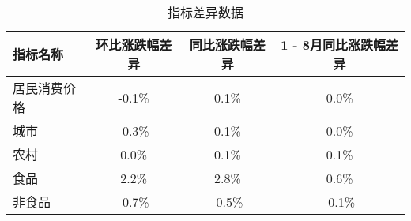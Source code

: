 \begin{table}[h]
    \centering
    \caption{指标差异数据}
    \begin{tabular}{lccc}
        \toprule
        指标名称 & 环比涨跌幅差异 & 同比涨跌幅差异 & 1 - 8月同比涨跌幅差异\\
        \midrule
        居民消费价格 & -0.1\% & 0.1\% & 0.0\%\\
        城市 & -0.3\% & 0.1\% & 0.0\%\\
        农村 & 0.0\% & 0.1\% & 0.1\%\\
        食品 & 2.2\% & 2.8\% & 0.6\%\\
        非食品 & -0.7\% & -0.5\% & -0.1\%\\
        \bottomrule
    \end{tabular}
\end{table}
\FloatBarrier